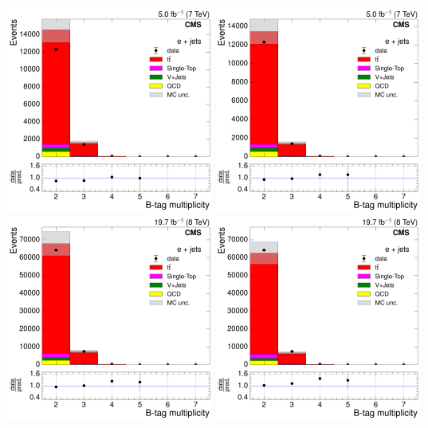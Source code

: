 \begin{figure}[hbtp]
    \centering
      \includegraphics[width=0.48\textwidth]{Chapters/07_08_09_Analysis/Images/control_plots/before_fit/7TeV/EPlusJets_N_BJets_with_ratio}\hfill
      \includegraphics[width=0.48\textwidth]{Chapters/07_08_09_Analysis/Images/control_plots/before_fit/7TeV/EPlusJets_N_BJets_reweighted_with_ratio}\\
      \includegraphics[width=0.48\textwidth]{Chapters/07_08_09_Analysis/Images/control_plots/before_fit/8TeV/EPlusJets_N_BJets_with_ratio}\hfill
      \includegraphics[width=0.48\textwidth]{Chapters/07_08_09_Analysis/Images/control_plots/before_fit/8TeV/EPlusJets_N_BJets_reweighted_with_ratio}\\

\end{figure}
